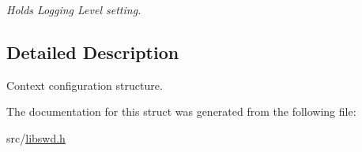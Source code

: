 \begin{DoxyCompactItemize}
\begin{DoxyCompactList}\small\item\em Holds Logging Level setting. \item\end{DoxyCompactList}\end{DoxyCompactItemize}


\subsection{Detailed Description}
Context configuration structure. 

The documentation for this struct was generated from the following file:\begin{DoxyCompactItemize}
\item 
src/\hyperlink{libswd_8h}{libswd.h}\end{DoxyCompactItemize}
